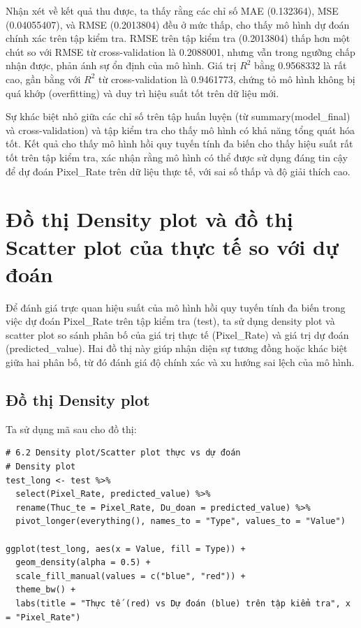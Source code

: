 Nhận xét về kết quả thu được, ta thấy rằng các chỉ số MAE (0.132364), MSE (0.04055407), và RMSE (0.2013804) đều ở mức thấp, cho thấy mô hình dự đoán chính xác trên tập kiểm tra. RMSE trên tập kiểm tra (0.2013804) thấp hơn một chút so với RMSE từ cross-validation là 0.2088001, nhưng vẫn trong ngưỡng chấp nhận được, phản ánh sự ổn định của mô hình. Giá trị $R^2$ bằng 0.9568332 là rất cao, gần bằng với $R^2$ từ cross-validation là 0.9461773, chứng tỏ mô hình không bị quá khớp (overfitting) và duy trì hiệu suất tốt trên dữ liệu mới.

Sự khác biệt nhỏ giữa các chỉ số trên tập huấn luyện (từ summary(model\_final) và cross-validation) và tập kiểm tra cho thấy mô hình có khả năng tổng quát hóa tốt. Kết quả cho thấy mô hình hồi quy tuyến tính đa biến cho thấy hiệu suất rất tốt trên tập kiểm tra, xác nhận rằng mô hình có thể được sử dụng đáng tin cậy để dự đoán Pixel\_Rate trên dữ liệu thực tế, với sai số thấp và độ giải thích cao.


\section{Đồ thị Density plot và đồ thị Scatter plot của thực tế so với dự đoán}

Để đánh giá trực quan hiệu suất của mô hình hồi quy tuyến tính đa biến trong việc dự đoán Pixel\_Rate trên tập kiểm tra (test), ta sử dụng density plot và scatter plot so sánh phân bố của giá trị thực tế (Pixel\_Rate) và giá trị dự đoán (predicted\_value). Hai đồ thị này giúp nhận diện sự tương đồng hoặc khác biệt giữa hai phân bố, từ đó đánh giá độ chính xác và xu hướng sai lệch của mô hình.

\subsection{Đồ thị Density plot}

Ta sử dụng mã sau cho đồ thị:

\begin{verbatim}
# 6.2 Density plot/Scatter plot thực vs dự đoán
# Density plot
test_long <- test %>%
  select(Pixel_Rate, predicted_value) %>%
  rename(Thuc_te = Pixel_Rate, Du_doan = predicted_value) %>%
  pivot_longer(everything(), names_to = "Type", values_to = "Value")

ggplot(test_long, aes(x = Value, fill = Type)) +
  geom_density(alpha = 0.5) +
  scale_fill_manual(values = c("blue", "red")) +
  theme_bw() +
  labs(title = "Thực tế (red) vs Dự đoán (blue) trên tập kiểm tra", x = "Pixel_Rate")
\end{verbatim}

